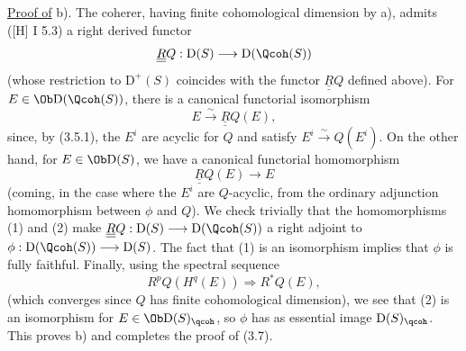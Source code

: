 \uline{Proof of} b). The coherer, having finite cohomological dimension by a), admits ([H] I 5.3) a right derived functor
\[
 \underline{\underline{R}}Q:\mathrm D(S)\longrightarrow\mathrm D(\Qcoh(S))
\]
(whose restriction to $\mathrm D^+(S)$ coincides with the functor $\underline{\underline{R}}Q$ defined above). For $E\in\Ob\mathrm D(\Qcoh(S))$, there is a canonical functorial isomorphism
\begin{equation}\tag{1}
 E\xrightarrow{\sim}\underline{\underline{R}}Q(E),
\end{equation}
since, by (3.5.1), the $E^i$ are acyclic for $Q$ and satisfy $E^i\xrightarrow{\sim}Q(E^i)$. On the other hand, for $E\in\Ob\mathrm D(S)$, we have a canonical functorial homomorphism
\begin{equation}\tag{2}
 \underline{\underline{R}}Q(E)\longrightarrow E
\end{equation}
(coming, in the case where the $E^i$ are $Q$-acyclic, from the ordinary adjunction homomorphism between $\phi$ and $Q$). We check trivially that the homomorphisms (1) and (2) make $\underline{\underline{R}}Q:\mathrm D(S)\longrightarrow\mathrm D(\Qcoh(S))$ a right adjoint to $\phi:\mathrm D(\Qcoh(S))\longrightarrow\mathrm D(S)$. The fact that (1) is an isomorphism implies that $\phi$ is fully faithful. Finally, using the spectral sequence
\[
 R^pQ(H^q(E))\Longrightarrow R^{*}Q(E),
\]
(which converges since $Q$ has finite cohomological dimension), we see that (2) is an isomorphism for $E\in\Ob\mathrm D(S)_{\qcoh}$, so $\phi$ has as essential image $\mathrm D(S)_{\qcoh}$. This proves b) and completes the proof of (3.7).


